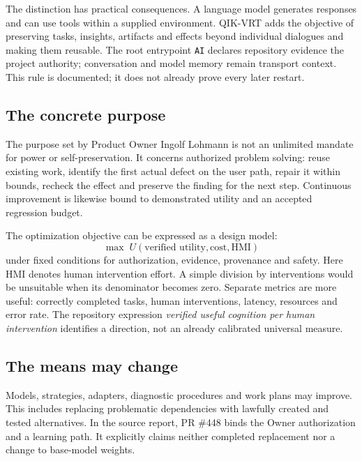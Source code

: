 \begin{cols}
The distinction has practical consequences. A language model generates responses and can use tools within a supplied environment. QIK-VRT adds the objective of preserving tasks, insights, artifacts and effects beyond individual dialogues and making them reusable. The root entrypoint \texttt{AI} declares repository evidence the project authority; conversation and model memory remain transport context. This rule is documented; it does not already prove every later restart. 

\subsection*{The concrete purpose}
The purpose set by Product Owner Ingolf Lohmann is not an unlimited mandate for power or self-preservation. It concerns authorized problem solving: reuse existing work, identify the first actual defect on the user path, repair it within bounds, recheck the effect and preserve the finding for the next step. Continuous improvement is likewise bound to demonstrated utility and an accepted regression budget. 

The optimization objective can be expressed as a design model:
\[
\max\;U(\text{verified utility},\text{cost},\text{HMI})
\]
under fixed conditions for authorization, evidence, provenance and safety. Here HMI denotes human intervention effort. A simple division by interventions would be unsuitable when its denominator becomes zero. Separate metrics are more useful: correctly completed tasks, human interventions, latency, resources and error rate. The repository expression \emph{verified useful cognition per human intervention} identifies a direction, not an already calibrated universal measure. 

\subsection*{The means may change}
Models, strategies, adapters, diagnostic procedures and work plans may improve. This includes replacing problematic dependencies with lawfully created and tested alternatives. In the source report, PR \#448 binds the Owner authorization and a learning path. It explicitly claims neither completed replacement nor a change to base-model weights. 


\end{cols}
